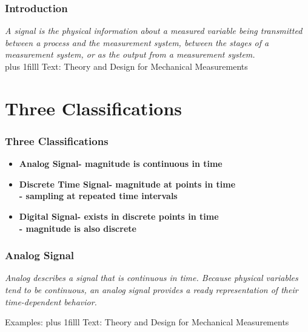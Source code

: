 \documentclass[fleqn]{beamer} %
\newcommand{\sectiontitleI}{Introduction}
\newcommand{\sectiontitleII}{Three Classifications}
\newcommand{\sectiontitleIII}{Analog Signal}
\newcommand{\btVFill}{\vskip0pt plus 1filll}
\begin{document}
	\begin{frame}[label=sectionI] \small
		\frametitle{\sectiontitleI}    				
		\bigskip
		
		{\it A {\PR signal} is the physical information about a measured variable being transmitted
		between a process and the measurement system, between the stages of a measurement system, or as
		the output from a measurement system. } \\
	
		
		\btVFill
		\tiny{Text: Theory and Design for Mechanical Measurements}	
	\end{frame}


\section{\sectiontitleII}	
	\begin{frame}[label=sectionII] \small
		\frametitle{\sectiontitleII}
		

	    \begin{itemize}
			\item \textbf{Analog Signal- magnitude is continuous in time }  \vspace{3mm} \\
			\item \textbf{Discrete Time Signal- magnitude at points in time}  \vspace{3mm} \\
			\textbf{ \hspace*{15mm} - sampling at repeated time intervals}  \vspace{3mm} \\
			\item \textbf{Digital Signal- exists in discrete points in time}  \vspace{3mm} \\
			\textbf{ \hspace*{15mm} - magnitude is also discrete}  \vspace{3mm} \\
		\end{itemize}
		
		
	\end{frame}

	\begin{frame} \small
		\frametitle{\sectiontitleIII}
		\bigskip    
		
		{\it {\RD Analog} describes a signal that is
		continuous in time. Because physical variables tend to be continuous, an analog signal provides a
		ready representation of their time-dependent behavior. }

		\vspace{40mm}
		Examples:  
		\btVFill
		\tiny{Text: Theory and Design for Mechanical Measurements}	
	\end{frame}
	
\end{document}
